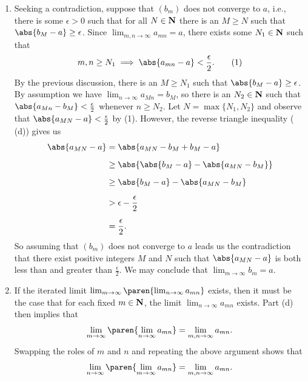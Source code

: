 \documentclass{lew98_solutions}
\begin{document}
\begin{solution}
\begin{enumerate}
        \item Seeking a contradiction, suppose that \( (b_m) \) does not converge to \( a \), i.e., there is some \( \epsilon > 0 \) such that for all \( N \in \mathbf{N} \) there is an \( M \geq N \) such that \( \abs{b_M - a} \geq \epsilon \). Since \( \lim_{m, n \to \infty} a_{mn} = a \), there exists some \( N_1 \in \mathbf{N} \) such that
        \[
            m, n \geq N_1 \implies \abs{a_{mn} - a} < \frac{\epsilon}{2}. \tag{1}
        \]
        By the previous discussion, there is an \( M \geq N_1 \) such that \( \abs{b_M - a} \geq \epsilon \). By assumption we have \( \lim_{n \to \infty} a_{Mn} = b_M \), so there is an \( N_2 \in \mathbf{N} \) such that \( \abs{a_{Mn} - b_M} < \tfrac{\epsilon}{2} \) whenever \( n \geq N_2 \). Let \( N = \max \{ N_1, N_2 \} \) and observe that \( \abs{a_{MN} - a} < \tfrac{\epsilon}{2} \) by (1). However, the reverse triangle inequality ( (d)) gives us
        \begin{align*}
            \abs{a_{MN} - a} &= \abs{a_{MN} - b_M + b_M - a} \\[2mm]
            &\geq \abs{\abs{b_M - a} - \abs{a_{MN} - b_M}} \\[2mm]
            &\geq \abs{b_M - a} - \abs{a_{MN} - b_M} \\[2mm]
            &> \epsilon - \frac{\epsilon}{2} \\[2mm]
            &= \frac{\epsilon}{2}.
        \end{align*}
        So assuming that \( (b_m) \) does not converge to \( a \) leads us the contradiction that there exist positive integers \( M \) and \( N \) such that \( \abs{a_{MN} - a} \) is both less than and greater than \( \tfrac{\epsilon}{2} \). We may conclude that \( \lim_{m \to \infty} b_m = a \).

        \item If the iterated limit \( \lim_{m \to \infty} \paren{ \lim_{n \to \infty} a_{mn} } \) exists, then it must be the case that for each fixed \( m \in \mathbf{N} \), the limit \( \lim_{n \to \infty} a_{mn} \) exists. Part (d) then implies that
        \[
            \lim_{m \to \infty} \paren{ \lim_{n \to \infty} a_{mn} } = \lim_{m, n \to \infty} a_{mn}.
        \]
        Swapping the roles of \( m \) and \( n \) and repeating the above argument shows that
        \[
            \lim_{n \to \infty} \paren{ \lim_{m \to \infty} a_{mn} } = \lim_{m, n \to \infty} a_{mn}.
        \]
    \end{enumerate}
\end{solution}
\end{document}
